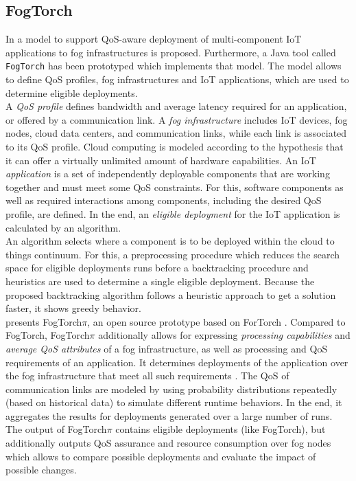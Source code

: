 \subsection*{FogTorch}
In \cite{fogtorch} a model to support QoS-aware deployment of multi-component IoT applications to fog infrastructures is proposed. Furthermore, a Java tool called \texttt{FogTorch} has been prototyped which implements that model. The model allows to define QoS profiles, fog infrastructures and IoT applications, which are used to determine eligible deployments.\\

A \textit{QoS profile} defines bandwidth and average latency required for an application, or offered by a communication link.
A \textit{fog infrastructure} includes IoT devices, fog nodes, cloud data centers, and communication links, while each link is associated to its QoS profile.
Cloud computing is modeled according to the hypothesis that it can offer a virtually unlimited amount of hardware capabilities.
An IoT \textit{application} is a set of independently deployable components that are working together and must meet some QoS constraints.
For this, software components as well as required interactions among components, including the desired QoS profile, are defined.
In the end, an \textit{eligible deployment} for the IoT application is calculated by an algorithm.\\

An algorithm selects where a component is to be deployed within the cloud to things continuum. For this, a preprocessing procedure which reduces the search space for eligible deployments runs before a backtracking procedure and heuristics are used to determine a single eligible deployment. Because the proposed backtracking algorithm follows a heuristic approach to get a solution faster, it shows greedy behavior.\\

\cite{fogtorchpi} presents FogTorch$\pi$, an open source prototype based on ForTorch \cite{fogtorch}.
Compared to FogTorch, FogTorch$\pi$ additionally allows for expressing \textit{processing capabilities} and \textit{average QoS attributes} of a fog infrastructure, as well as processing and QoS requirements of an application.
It determines deployments of the application over the fog infrastructure that meet all such requirements \cite{fogtorchpi}.
The QoS of communication links are modeled by using probability distributions repeatedly (based on historical data) to simulate different runtime behaviors.
In the end, it aggregates the results for deployments generated over a large number of runs.
The output of FogTorch$\pi$ contains eligible deployments (like FogTorch), but additionally outputs QoS assurance and resource consumption over fog nodes which allows to compare possible deployments and evaluate the impact of possible changes.

